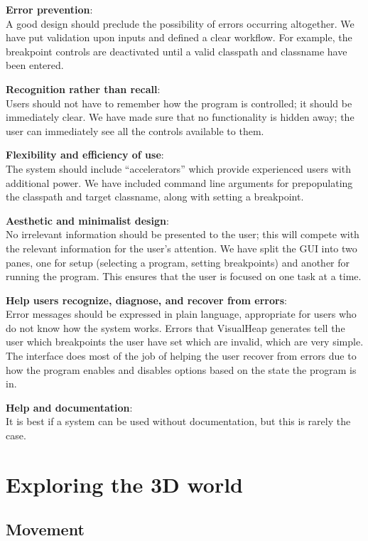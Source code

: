 \documentclass[11pt, a4paper]{report}
\begin{document}
{\bfseries Error prevention}: \\
A good design should preclude the possibility of errors occurring altogether. We have put validation upon inputs and defined a clear workflow. For example, the breakpoint controls are deactivated until a valid classpath and classname have been entered.

{\bfseries Recognition rather than recall}: \\
Users should not have to remember how the program is controlled; it should be immediately clear. We have made sure that no functionality is hidden away; the user can immediately see all the controls available to them.

{\bfseries Flexibility and efficiency of use}: \\
The system should include “accelerators” which provide experienced users with additional power. We have included command line arguments for prepopulating the classpath and target classname, along with setting a breakpoint.

{\bfseries Aesthetic and minimalist design}: \\
No irrelevant information should be presented to the user; this will compete with the relevant information for the user’s attention. We have split the GUI into two panes, one for setup (selecting a program, setting breakpoints) and another for running the program. This ensures that the user is focused on one task at a time.

{\bfseries Help users recognize, diagnose, and recover from errors}: \\
Error messages should be expressed in plain language, appropriate for users who do not know how the system works. Errors that VisualHeap generates tell the user which breakpoints the user have set which are invalid, which are very simple. The interface does most of the job of helping the user recover from errors due to how the program enables and disables options based on the state the program is in.
 

{\bfseries Help and documentation}: \\
It is best if a system can be used without documentation, but this is rarely the case.

\section{Exploring the 3D world}

\subsection{Movement}
\end{document}
